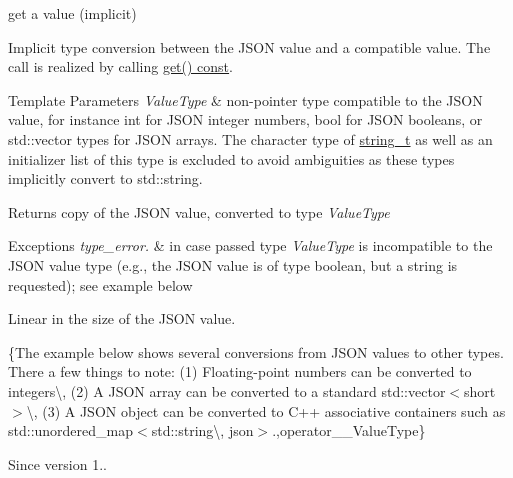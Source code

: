 get a value (implicit) 

Implicit type conversion between the J\+S\+ON value and a compatible value. The call is realized by calling \hyperlink{classnlohmann_1_1basic__json_ac41d1fda870c3f3c4ead932c2e3ab61f}{get() const}.


\begin{DoxyTemplParams}{Template Parameters}
{\em Value\+Type} & non-\/pointer type compatible to the J\+S\+ON value, for instance {\ttfamily int} for J\+S\+ON integer numbers, {\ttfamily bool} for J\+S\+ON booleans, or {\ttfamily std\+::vector} types for J\+S\+ON arrays. The character type of \hyperlink{classnlohmann_1_1basic__json_a61f8566a1a85a424c7266fb531dca005}{string\+\_\+t} as well as an initializer list of this type is excluded to avoid ambiguities as these types implicitly convert to {\ttfamily std\+::string}.\\
\hline
\end{DoxyTemplParams}
\begin{DoxyReturn}{Returns}
copy of the J\+S\+ON value, converted to type {\itshape Value\+Type} 
\end{DoxyReturn}

\begin{DoxyExceptions}{Exceptions}
{\em type\+\_\+error.} & in case passed type {\itshape Value\+Type} is incompatible to the J\+S\+ON value type (e.\+g., the J\+S\+ON value is of type boolean, but a string is requested); see example below\\
\hline
\end{DoxyExceptions}
Linear in the size of the J\+S\+ON value.

\{The example below shows several conversions from J\+S\+ON values to other types. There a few things to note\+: (1) Floating-\/point numbers can be converted to integers\textbackslash{}, (2) A J\+S\+ON array can be converted to a standard {\ttfamily std\+::vector$<$short$>$}\textbackslash{}, (3) A J\+S\+ON object can be converted to C++ associative containers such as {\ttfamily std\+::unordered\+\_\+map$<$std\+::string\textbackslash{}, json$>$}.,operator\+\_\+\+\_\+\+Value\+Type\}

\begin{DoxySince}{Since}
version 1.. 
\end{DoxySince}
